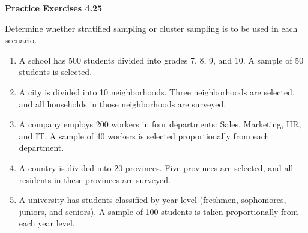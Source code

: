 \vspace{0.3ex}
\noindent\textbf{Practice Exercises 4.25}

\vspace{0.2ex}

Determine whether stratified sampling or cluster sampling is to be used in each scenario.

\begin{enumerate}
    \item A school has 500 students divided into grades 7, 8, 9, and 10. A sample of 50 students is selected.
    \item A city is divided into 10 neighborhoods. Three neighborhoods are selected, and all households in those neighborhoods are surveyed.
    \item A company employs 200 workers in four departments: Sales, Marketing, HR, and IT. A sample of 40 workers is selected proportionally from each department.
    \item A country is divided into 20 provinces. Five provinces are selected, and all residents in these provinces are surveyed.
    \item A university has students classified by year level (freshmen, sophomores, juniors, and seniors). A sample of 100 students is taken proportionally from each year level.
\end{enumerate}
